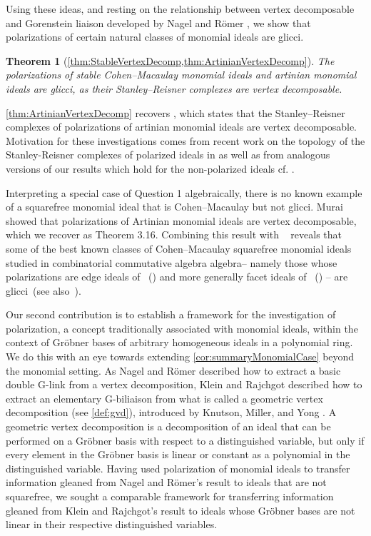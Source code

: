 \documentclass[12pt, reqno]{amsart}
\numberwithin{equation}{section}
\newtheorem{Main Conjecture}[theorem]{Main Conjecture}
\theoremstyle{definition}
\theoremstyle{plain}
\newtheorem{introthm}{Theorem}
\begin{document}
  Using these ideas, and resting on the relationship between vertex decomposable and Gorenstein liaison developed by Nagel and R\"omer \cite{NR08}, we show that polarizations of certain natural classes of monomial ideals are glicci.

 
\begin{introthm}[\cref{thm:StableVertexDecomp,thm:ArtinianVertexDecomp}]
     The polarizations of stable Cohen--Macaulay monomial ideals and  artinian monomial ideals are glicci, as their  Stanley--Reisner complexes are vertex decomposable.
 \end{introthm}

    
   \cref{thm:ArtinianVertexDecomp} recovers \cite[Remark 1.8]{M2011}, which states that the Stanley--Reisner complexes of polarizations of artinian monomial ideals are vertex decomposable. Motivation for these investigations comes from recent work on the topology of the Stanley-Reisner complexes of polarized ideals in \cite{AFL22, FM22} as well as from analogous versions of our results which hold for the non-polarized ideals cf. \cite{MN02}. 

   Interpreting a special case of Question 1 algebraically, there is no known example of a squarefree monomial ideal that is Cohen–Macaulay but not glicci.  Murai~\cite{M2011} showed that polarizations of Artinian monomial ideals are vertex decomposable, which we recover as Theorem 3.16.  Combining this result with ~\cite[Theorem 3.3]{NR08} reveals that some of the best known classes of Cohen--Macaulay squarefree monomial ideals studied in combinatorial commutative algebra algebra-- namely those whose polarizations are edge ideals of ~(\cite{V1990}) and more generally facet ideals of ~(\cite{Fa2005}) -- are glicci~(see also~\cite{CFHNVT2025}).

 
 Our second contribution is to establish a framework for the investigation of polarization, a concept traditionally associated with monomial ideals, within the context of Gr\"obner bases of arbitrary homogeneous ideals in a polynomial ring. We do this with an eye towards extending \cref{cor:summaryMonomialCase} beyond the monomial setting. As Nagel and R\"omer \cite{NR08} described how to extract a basic double G-link from a vertex decomposition, Klein and Rajchgot \cite{KR21} described how to extract an elementary G-biliaison from what is called a geometric vertex decomposition (see \cref{def:gvd}), introduced by Knutson, Miller, and Yong \cite{KMY09}. A geometric vertex decomposition is a decomposition of an ideal that can be performed on a Gr\"obner basis with respect to a distinguished variable, but only if every element in the Gr\"obner basis is linear or constant as a polynomial in the distinguished variable. Having used polarization of monomial ideals to transfer information gleaned from Nagel and R\"omer's result to ideals that are not squarefree, we sought a comparable framework for transferring information gleaned from Klein and Rajchgot's result to ideals whose Gr\"obner bases are not linear in their respective distinguished variables.
 
\end{document}
